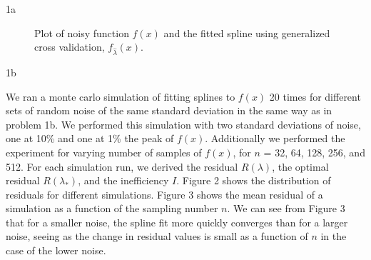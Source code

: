\documentclass[11pt]{article}
\begin{document}
\begin{homeworkProblem}
\begin{homeworkSection}{1a}
\begin{figure}[!ht]
\begin{centering}
                \caption{Plot of noisy function $f(x)$ and the fitted spline
                using generalized cross validation, $f_{\hat{\lambda}}(x)$.}

            \end{centering}
        \end{figure}


    \end{homeworkSection}

    \begin{homeworkSection}{1b}

        We ran a monte carlo simulation of fitting splines to $f(x)$ 20 times
        for different sets of random noise of the same standard deviation in
        the same way as in problem 1b. We performed this simulation with two
        standard deviations of noise, one at 10\% and one at 1\% the peak of
        $f(x)$. Additionally we performed the experiment for varying number of
        samples of $f(x)$, for $n$ = 32, 64, 128, 256, and 512. For each
        simulation run, we derived the residual $R(\lambda)$, the optimal
        residual $R(\lambda_*)$, and the inefficiency $I$. Figure 2 shows the
        distribution of residuals for different simulations. Figure 3 shows the
        mean residual of a simulation as a function of the sampling number $n$.
        We can see from Figure 3 that for a smaller noise, the spline fit
        more quickly converges than for a larger noise, seeing as the change in
        residual values is small as a function of $n$ in the case of the lower
        noise.


\end{homeworkSection}
\end{homeworkProblem}
\end{document}
